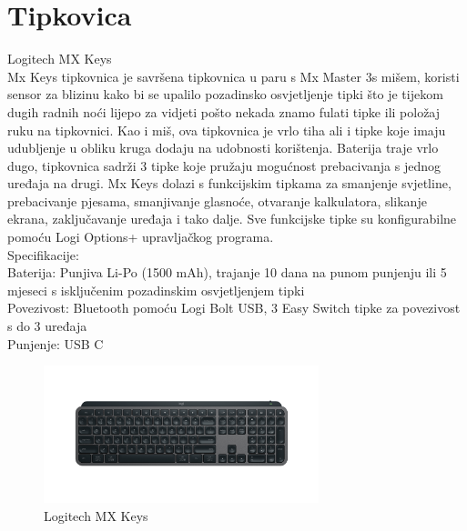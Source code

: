 \documentclass{report}
\begin{document}
\chapter{Tipkovica}
Logitech MX Keys
\\Mx Keys tipkovnica je savršena tipkovnica u paru s Mx Master 3s mišem, koristi sensor za blizinu kako bi se upalilo pozadinsko osvjetljenje tipki što je tijekom dugih radnih noći lijepo za vidjeti pošto nekada znamo fulati tipke ili položaj ruku na tipkovnici. Kao i miš, ova tipkovnica je vrlo tiha ali i tipke koje imaju udubljenje u obliku kruga dodaju na udobnosti korištenja. Baterija traje vrlo dugo, tipkovnica sadrži 3 tipke koje pružaju mogućnost prebacivanja s jednog uređaja na drugi. Mx Keys dolazi s funkcijskim tipkama za smanjenje svjetline, prebacivanje pjesama, smanjivanje glasnoće, otvaranje kalkulatora, slikanje ekrana, zaključavanje uređaja i tako dalje. Sve funkcijske tipke su konfigurabilne pomoću Logi Options+ upravljačkog programa.
\\Specifikacije:
\\Baterija: Punjiva Li-Po (1500 mAh), trajanje 10 dana na punom punjenju ili 5 mjeseci s isključenim pozadinskim osvjetljenjem tipki
\\Povezivost: Bluetooth pomoću Logi Bolt USB, 3 Easy Switch tipke za povezivost s do 3 uređaja
\\Punjenje: USB C
\begin{figure}[h]
\includegraphics[width=8cm]{Tipkovnica.png}
\caption{Logitech MX Keys}
\end{figure}
\end{document}
